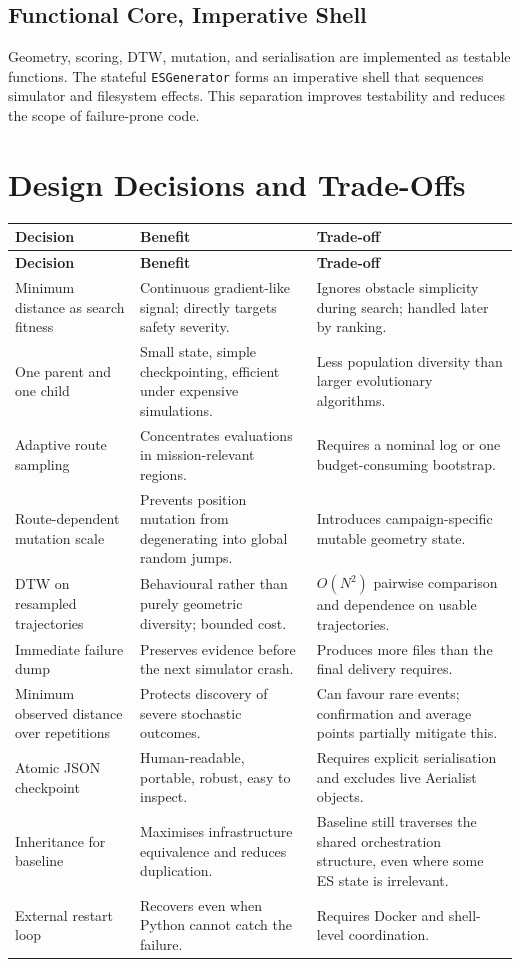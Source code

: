 \documentclass[11pt,a4paper,openany]{report}
\newcommand{\code}[1]{\texttt{#1}}
\begin{document}
\subsection{Functional Core, Imperative Shell}
Geometry, scoring, DTW, mutation, and serialisation are implemented as testable functions. The stateful \code{ESGenerator} forms an imperative shell that sequences simulator and filesystem effects. This separation improves testability and reduces the scope of failure-prone code.

\section{Design Decisions and Trade-Offs}
\begin{longtable}{L{4cm} L{5.2cm} L{5.2cm}}
\toprule
\textbf{Decision} & \textbf{Benefit} & \textbf{Trade-off}\\
\midrule
\endfirsthead
\toprule
\textbf{Decision} & \textbf{Benefit} & \textbf{Trade-off}\\
\midrule
\endhead
Minimum distance as search fitness & Continuous gradient-like signal; directly targets safety severity. & Ignores obstacle simplicity during search; handled later by ranking.\\
One parent and one child & Small state, simple checkpointing, efficient under expensive simulations. & Less population diversity than larger evolutionary algorithms.\\
Adaptive route sampling & Concentrates evaluations in mission-relevant regions. & Requires a nominal log or one budget-consuming bootstrap.\\
Route-dependent mutation scale & Prevents position mutation from degenerating into global random jumps. & Introduces campaign-specific mutable geometry state.\\
DTW on resampled trajectories & Behavioural rather than purely geometric diversity; bounded cost. & $O(N^2)$ pairwise comparison and dependence on usable trajectories.\\
Immediate failure dump & Preserves evidence before the next simulator crash. & Produces more files than the final delivery requires.\\
Minimum observed distance over repetitions & Protects discovery of severe stochastic outcomes. & Can favour rare events; confirmation and average points partially mitigate this.\\
Atomic JSON checkpoint & Human-readable, portable, robust, easy to inspect. & Requires explicit serialisation and excludes live Aerialist objects.\\
Inheritance for baseline & Maximises infrastructure equivalence and reduces duplication. & Baseline still traverses the shared orchestration structure, even where some ES state is irrelevant.\\
External restart loop & Recovers even when Python cannot catch the failure. & Requires Docker and shell-level coordination.\\
\bottomrule
\end{longtable}
\end{document}
